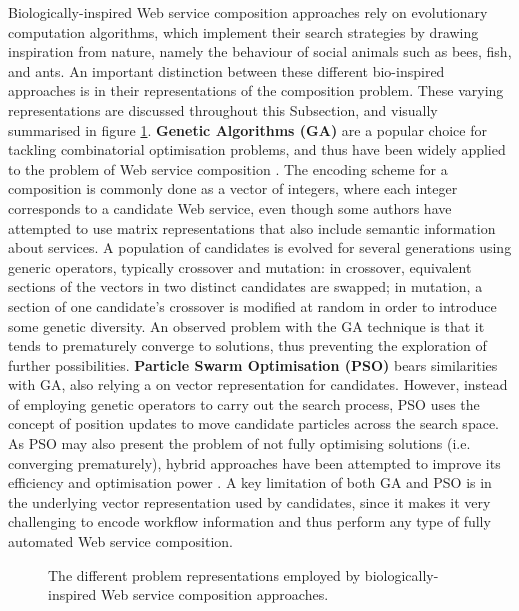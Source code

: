Biologically-inspired Web service composition approaches rely on evolutionary computation algorithms, which implement their search strategies by drawing inspiration from nature, namely the behaviour of social animals such as bees, fish, and ants. An important distinction between these different bio-inspired approaches is in their representations of the composition problem. These varying representations are discussed throughout this Subsection, and visually summarised in figure \ref{fig:representations}. \textbf{Genetic Algorithms (GA)} are a popular choice for tackling combinatorial optimisation problems, and thus have been widely applied to the problem of Web service composition \cite{wang2012survey}. The encoding scheme for a composition is commonly done as a vector of integers, where each integer corresponds to a candidate Web service, even though some authors have attempted to use matrix representations that also include semantic information about services. A population of candidates is evolved for several generations using generic operators, typically crossover and mutation: in crossover, equivalent sections of the vectors in two distinct candidates are swapped; in mutation, a section of one candidate's crossover is modified at random in order to introduce some genetic diversity. An observed problem with the GA technique is that it tends to prematurely converge to solutions, thus preventing the exploration of further possibilities. \textbf{Particle Swarm Optimisation (PSO)} bears similarities with GA, also relying a on vector representation for candidates. However, instead of employing genetic operators to carry out the search process, PSO uses the concept of position updates to move candidate particles across the search space. As PSO may also present the problem of not fully optimising solutions (i.e. converging prematurely), hybrid approaches have been attempted to improve its efficiency and optimisation power \cite{wang2012survey}. A key limitation of both GA and PSO is in the underlying vector representation used by candidates, since it makes it very challenging to encode workflow information and thus perform any type of fully automated Web service composition.

\begin{figure}
\centerline{
\fbox{
}}
\caption{The different problem representations employed by biologically-inspired Web service composition approaches.}
\label{fig:representations}
\end{figure}

